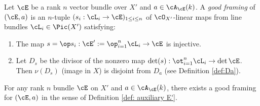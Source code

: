 \begin{defn}
\notready\label{def: auxiliary E'}  Let $\cE$ be a rank $n$ vector bundle over $X'$ and $a\in \cA_{\cE}(k)$. A {\em good framing} of $(\cE,a)$ is an $n$-tuple $(s_{i}: \cL_{i}\to \cE)_{1\le i\le n}$ of $\cO_{X'}$-linear maps from line bundles $\cL_{i}\in \Pic(X')$ satisfying:
\begin{enumerate}
\item The map $s=\op s_{i}: \cE':=\op_{i=1}^{n}\cL_{i}\to \cE$ is injective.
\item Let $D_{s}$ be the divisor of the nonzero map $\det(s): \ot_{i=1}^{n}\cL_{i}\to \det\cE$. Then $\nu(D_{s})$ (image in $X$) is  disjoint from $D_{a}$ (see Definition \ref{def:Da}). %
\end{enumerate}
\end{defn}

\begin{lemma}
\notready For any rank $n$ bundle $\cE$ on $X'$ and $a\in \cA_{\cE}(k)$, there exists a good framing for $(\cE,a)$ in the sense of Definition \ref{def: auxiliary E'}.
\end{lemma}

